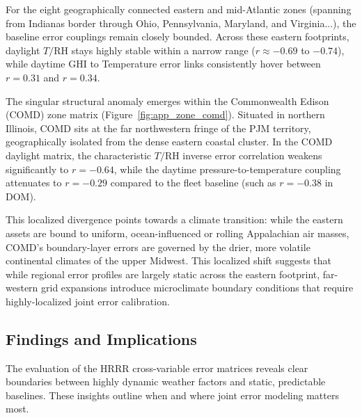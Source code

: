 For the eight geographically connected eastern and mid-Atlantic zones (spanning from Indianas border through Ohio, Pennsylvania, Maryland, and Virginia...), the baseline error couplings remain closely bounded. Across these eastern footprints, daylight $T/\text{RH}$ stays highly stable within a narrow range ($r \approx -0.69$ to $-0.74$), while daytime GHI to Temperature error links consistently hover between $r = 0.31$ and $r = 0.34$.

The singular structural anomaly emerges within the Commonwealth Edison (COMD) zone matrix (Figure~\ref{fig:app_zone_comd}). Situated in northern Illinois, COMD sits at the far northwestern fringe of the PJM territory, geographically isolated from the dense eastern coastal cluster. In the COMD daylight matrix, the characteristic $T/\text{RH}$ inverse error correlation weakens significantly to $r = -0.64$, while the daytime pressure-to-temperature coupling attenuates to $r = -0.29$ compared to the fleet baseline (such as $r = -0.38$ in DOM).

This localized divergence points towards a climate transition: while the eastern assets are bound to uniform, ocean-influenced or rolling Appalachian air masses, COMD’s boundary-layer errors are governed by the drier, more volatile continental climates of the upper Midwest. This localized shift suggests that while regional error profiles are largely static across the eastern footprint, far-western grid expansions introduce microclimate boundary conditions that require highly-localized joint error calibration.



\subsection{Findings and Implications}

The evaluation of the HRRR cross-variable error matrices reveals clear boundaries between highly dynamic weather factors and static, predictable baselines. These insights outline when and where joint error modeling matters most.

